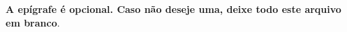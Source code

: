 \begin{epigrafe}
    \vspace*{\fill}
	\begin{flushright}
		\textbf{A epígrafe é opcional. Caso não deseje uma, deixe todo
		este arquivo em branco}.

	\end{flushright}
\end{epigrafe}
